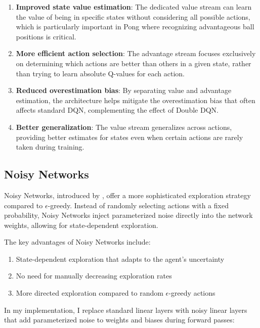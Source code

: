 \documentclass[a4paper]{article}
\begin{document}
\begin{enumerate}
\item \textbf{Improved state value estimation}: The dedicated value stream can learn the value of being in specific states without considering all possible actions, which is particularly important in Pong where recognizing advantageous ball positions is critical.
\item \textbf{More efficient action selection}: The advantage stream focuses exclusively on determining which actions are better than others in a given state, rather than trying to learn absolute Q-values for each action.
\item \textbf{Reduced overestimation bias}: By separating value and advantage estimation, the architecture helps mitigate the overestimation bias that often affects standard DQN, complementing the effect of Double DQN.
\item \textbf{Better generalization}: The value stream generalizes across actions, providing better estimates for states even when certain actions are rarely taken during training.
\end{enumerate}

\subsection{Noisy Networks}

Noisy Networks, introduced by \cite{fortunato2018noisy}, offer a more sophisticated exploration strategy compared to $\epsilon$-greedy. Instead of randomly selecting actions with a fixed probability, Noisy Networks inject parameterized noise directly into the network weights, allowing for state-dependent exploration.

The key advantages of Noisy Networks include:
\begin{enumerate}
\item State-dependent exploration that adapts to the agent's uncertainty
\item No need for manually decreasing exploration rates
\item More directed exploration compared to random $\epsilon$-greedy actions
\end{enumerate} 

In my implementation, I replace standard linear layers with noisy linear layers that add parameterized noise to weights and biases during forward passes:
\end{document}
